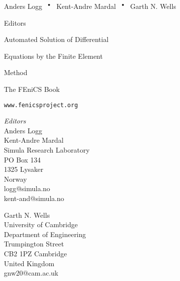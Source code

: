 \thispagestyle{empty}

\noindent
{\Large Anders Logg}
{$\,\,\,^\bullet\,\,\,$}
{\Large Kent-Andre Mardal}
{$\,\,\,^\bullet\,\,\,$}
{\Large Garth N. Wells}

\vspace{1ex}

\noindent
{\large Editors}

\vspace{11ex}

\noindent
{\Huge Automated Solution of Differential}

\vspace{2.5ex}

\noindent
{\Huge Equations by the Finite Element}

\vspace{2ex}

\noindent
{\Huge Method}

\vspace{6ex}

\noindent
{\Large
The FEniCS Book}

\vfill

\noindent
{\large \tt www.fenicsproject.org}

\newpage
\thispagestyle{empty}

\noindent
\begin{minipage}{0.5\textwidth}
  \emph{Editors} \\
  Anders Logg \\
  Kent-Andre Mardal \\
  Simula Research Laboratory \\
  PO Box 134 \\
  1325 Lysaker \\
  Norway \\
  logg@simula.no \\
  kent-and@simula.no
\end{minipage}
\begin{minipage}{0.5\textwidth}
  \noindent
  Garth N. Wells \\
  University of Cambridge \\
  Department of Engineering \\
  Trumpington Street \\
  CB2 1PZ Cambridge \\
  United Kingdom \\
  gnw20@cam.ac.uk \\
\end{minipage}

